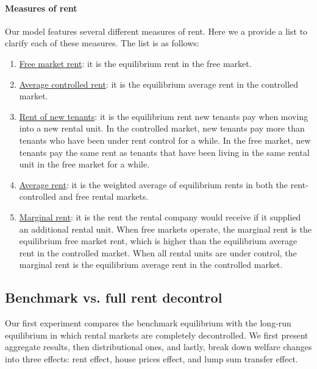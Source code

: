 \documentclass[parskip=full]{article}
\begin{document}
\paragraph{Measures of rent} Our model features several different measures of rent. Here we a provide a list to clarify each of these measures. The list is as follows: 

\begin{enumerate}
    \item \underline{Free market rent}: it is the equilibrium rent in the free market.
    \item \underline{Average controlled rent}: it is the equilibrium average rent in the controlled market.
    \item \underline{Rent of new tenants}: it is the equilibrium rent new tenants pay when moving into a new rental unit. In the controlled market, new tenants pay more than tenants who have been under rent control for a while. In the free market, new tenants pay the same rent as tenants that have been living in the same rental unit in the free market for a while.
    \item \underline{Average rent}: it is the weighted average of equilibrium rents in both the rent-controlled and free rental markets.
    \item \underline{Marginal rent}: it is the rent the rental company would receive if it supplied an additional rental unit. When free markets operate, the marginal rent is the equilibrium free market rent, which is higher than the equilibrium average rent in the controlled market. When all rental units are under control, the marginal rent is the equilibrium average rent in the controlled market.
\end{enumerate}

\subsection{Benchmark vs. full rent decontrol}
Our first experiment compares the benchmark equilibrium with the long-run equilibrium in which rental markets are completely decontrolled. We first present aggregate results, then distributional ones, and lastly, break down welfare changes into three effects: rent effect, house prices effect, and lump sum transfer effect.
\end{document}
